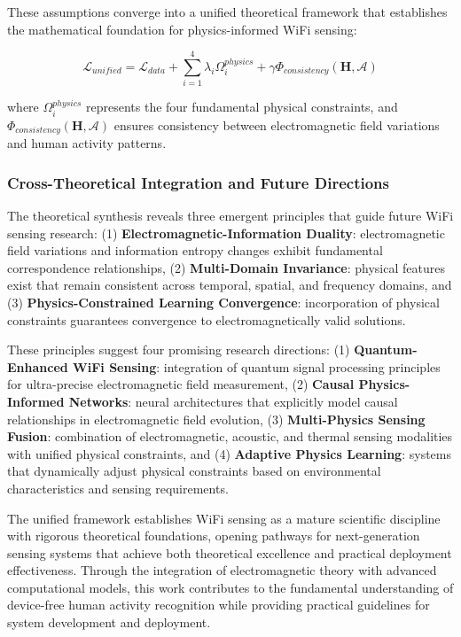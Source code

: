 \documentclass[journal]{IEEEtran}
\begin{document}
These assumptions converge into a unified theoretical framework that establishes the mathematical foundation for physics-informed WiFi sensing:

\begin{equation}
\mathcal{L}_{unified} = \mathcal{L}_{data} + \sum_{i=1}^{4} \lambda_i \Omega_i^{physics} + \gamma \Phi_{consistency}(\mathbf{H}, \mathcal{A})
\label{eq:unified_framework}
\end{equation}

where $\Omega_i^{physics}$ represents the four fundamental physical constraints, and $\Phi_{consistency}(\mathbf{H}, \mathcal{A})$ ensures consistency between electromagnetic field variations and human activity patterns.

\subsubsection{Cross-Theoretical Integration and Future Directions}

The theoretical synthesis reveals three emergent principles that guide future WiFi sensing research: (1) \textbf{Electromagnetic-Information Duality}: electromagnetic field variations and information entropy changes exhibit fundamental correspondence relationships, (2) \textbf{Multi-Domain Invariance}: physical features exist that remain consistent across temporal, spatial, and frequency domains, and (3) \textbf{Physics-Constrained Learning Convergence}: incorporation of physical constraints guarantees convergence to electromagnetically valid solutions.

These principles suggest four promising research directions: (1) \textbf{Quantum-Enhanced WiFi Sensing}: integration of quantum signal processing principles for ultra-precise electromagnetic field measurement, (2) \textbf{Causal Physics-Informed Networks}: neural architectures that explicitly model causal relationships in electromagnetic field evolution, (3) \textbf{Multi-Physics Sensing Fusion}: combination of electromagnetic, acoustic, and thermal sensing modalities with unified physical constraints, and (4) \textbf{Adaptive Physics Learning}: systems that dynamically adjust physical constraints based on environmental characteristics and sensing requirements.

The unified framework establishes WiFi sensing as a mature scientific discipline with rigorous theoretical foundations, opening pathways for next-generation sensing systems that achieve both theoretical excellence and practical deployment effectiveness. Through the integration of electromagnetic theory with advanced computational models, this work contributes to the fundamental understanding of device-free human activity recognition while providing practical guidelines for system development and deployment.
\end{document}
